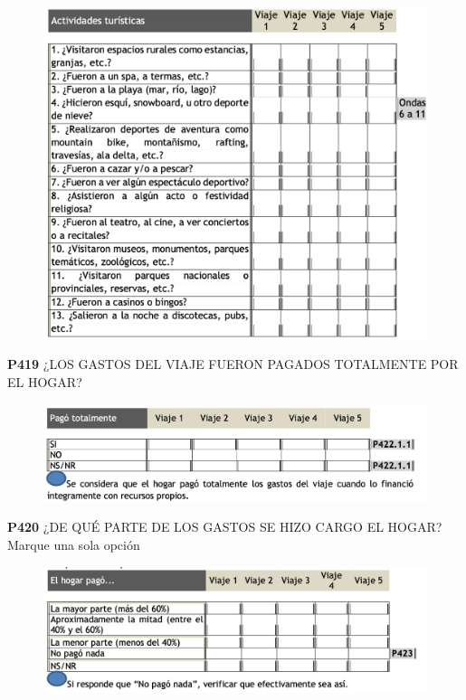 \documentclass[
  openany]{book}
\begin{document}
\begin{figure}

{\centering \includegraphics[width=1\linewidth]{imagenes/figura6-185} 

}

\end{figure}

\textbf{P419} ¿LOS GASTOS DEL VIAJE FUERON PAGADOS TOTALMENTE POR EL HOGAR?

\begin{figure}

{\centering \includegraphics[width=1\linewidth]{imagenes/figura6-186} 

}

\end{figure}

\textbf{P420} ¿DE QUÉ PARTE DE LOS GASTOS SE HIZO CARGO EL HOGAR?
Marque una sola opción

\begin{figure}

{\centering \includegraphics[width=1\linewidth]{imagenes/figura6-187} 

}

\end{figure}
\end{document}

